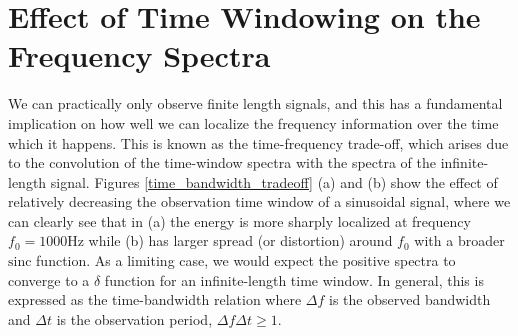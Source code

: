 \documentclass[10pt]{article}
\begin{document}
\section{Effect of Time Windowing on the Frequency Spectra}

We can practically only observe finite length signals, and this has a fundamental implication on how well we can localize the frequency information over the time which it happens. This is known as the time-frequency trade-off, which arises due to the convolution of the time-window spectra with the spectra of the infinite-length signal. Figures \ref{time_bandwidth_tradeoff} (a) and (b) show the effect of relatively decreasing the observation time window of a sinusoidal signal, where we can clearly see that in (a) the energy is more sharply localized at frequency $f_0 = 1000$Hz while (b) has larger spread (or distortion) around $f_0$ with a broader $\text{sinc}$ function. As a limiting case, we would expect the positive spectra to converge to a $\delta$ function for an infinite-length time window. In general, this is expressed as the time-bandwidth relation where $\Delta f$ is the observed bandwidth and $\Delta t$ is the observation period, $\Delta f \Delta t \geq 1$.
\end{document}
